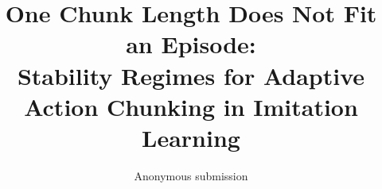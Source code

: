 \documentclass{article} %
\title{One Chunk Length Does Not Fit an Episode:\\
Stability Regimes for Adaptive Action Chunking in Imitation Learning}
\author{Anonymous submission}
\begin{document}
\maketitle

\begin{abstract}

\end{abstract}












\end{document}
